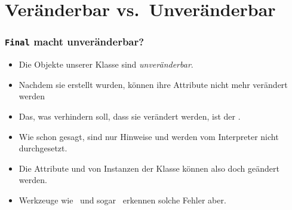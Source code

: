 \documentclass[aspectratio=169,mathserif,notheorems]{beamer}%
\begin{document}
\section{Veränderbar vs.\ Unveränderbar}%
%
\begin{frame}%
\frametitle{\texttt{Final} macht unveränderbar?}%
%
\begin{itemize}%
\item Die Objekte unserer Klasse  sind \emph{unveränderbar}.%
%
\item<2-> Nachdem sie erstellt wurden, können ihre Attribute nicht mehr verändert werden%
%
\item<4-> Das, was verhindern soll, dass sie verändert werden, ist der  .%
%
\item<5-> Wie schon gesagt,  sind nur Hinweise und werden vom Interpreter nicht durchgesetzt.%
%
\item<6-> Die Attribute  und  von Instanzen der Klasse  können also doch geändert werden.%
%
\item<7-> Werkzeuge wie \mypy\ und sogar \pycharm\ erkennen solche Fehler aber.%
%
\end{itemize}%
%
\end{frame}%
%
\end{document}
